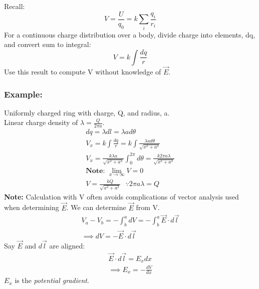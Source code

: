 \documentclass[a4paper, 11pt, fleqn, normalem]{report}
\begin{document}
\chapter{}
Recall:
\begin{equation*}
    V = \frac{U}{q_{0}} = k \sum_{i} \frac{q_{i}}{r_{i}}
\end{equation*}
For a continuous charge distribution over a body, divide charge into elements, dq, and convert sum to integral:
\begin{equation*}
    V = k \int \frac{dq}{r}
\end{equation*}
Use this result to compute V without knowledge of $\vec{E}$.

\subsection{Example:}
Uniformly charged ring with charge, Q, and radius, a. \\
Linear charge density of $\lambda = \frac{Q}{2\pi a}$.
\begin{gather*}
    dq = \lambda dl = \lambda a d\theta \\
    V_{x} = k \int \frac{dq}{r} = k \int \frac{\lambda a d\theta}{\sqrt{x^{2} + a^{2}}} \\
    V_{x} = \frac{k\lambda a}{\sqrt{x^{2} + a^{2}}} \int_{0}^{2\pi} d\theta = \frac{k2\pi a \lambda}{\sqrt{x^{2} + a^{2}}} \\
    \textbf{Note: } \lim_{x \to \infty} V = 0 \\
    V = \frac{kQ}{\sqrt{x^{2} + a^{2}}} ~~~ \because 2\pi a \lambda = Q
\end{gather*}
\textbf{Note:} Calculation with V often avoids complications of vector analysis used when determining $\vec{E}$. We can determine $\vec{E}$ from V.
\begin{gather*}
    V_{a} - V_{b} = - \int_{b}^{a} dV = - \int_{b}^{a} \vec{E} \cdot d\vec{l} \\
    \implies dV = - \vec{E} \cdot d\vec{l}
\end{gather*}
Say $\vec{E}$ and $d\vec{l}$ are aligned:
\begin{gather*}
    \vec{E} \cdot d\vec{l} = E_{x}dx \\
    \implies E_{x} = - \frac{dV}{dx}
\end{gather*}
$E_{x}$ is the \emph{potential gradient}.
\end{document}
